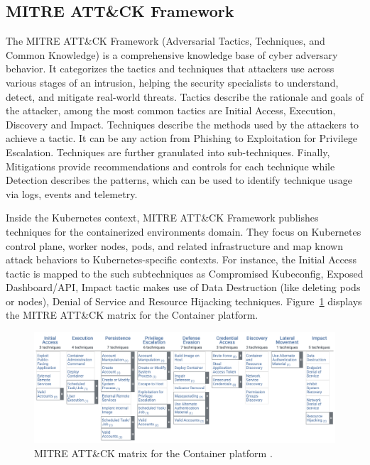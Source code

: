 \subsection{MITRE ATT\&CK Framework}

The MITRE ATT\&CK Framework (Adversarial Tactics, Techniques, and Common Knowledge) is a comprehensive knowledge base of cyber adversary behavior. It categorizes the tactics and techniques that attackers use across various stages of an intrusion, helping the security specialists to understand, detect, and mitigate real-world threats. Tactics describe the rationale and goals of the attacker, among the most common tactics are Initial Access, Execution, Discovery and Impact. Techniques describe the methods used by the attackers to achieve a tactic. It can be any action from Phishing to Exploitation for Privilege Escalation. Techniques are further granulated into sub-techniques. Finally, Mitigations provide recommendations and controls for each technique while Detection describes the patterns, which can be used to identify technique usage via logs, events and telemetry.

Inside the Kubernetes context, MITRE ATT\&CK Framework publishes techniques for the containerized environments domain. They focus on Kubernetes control plane, worker nodes, pods, and related infrastructure and map known attack behaviors to Kubernetes-specific contexts. For instance, the Initial Access tactic is mapped to the such subtechniques as Compromised Kubeconfig, Exposed Dashboard/API, Impact tactic makes use of Data Destruction (like deleting pods or nodes), Denial of Service and Resource Hijacking techniques. Figure~\ref{img:mitre-attack-matrix} displays the MITRE ATT\&CK matrix for the Container platform.

\begin{figure}[!hbt]
	\begin{center}
		\includegraphics[width=\textwidth]{images/mitre-attack-matrix.png}
        \caption{MITRE ATT\&CK matrix for the Container platform \cite{mitre-attack-framework}.}
		\label{img:mitre-attack-matrix}
	\end{center}
\end{figure}